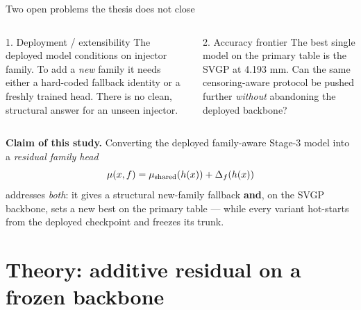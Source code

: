 \documentclass[UTF8,aspectratio=169]{ctexbeamer}
\begin{document}
\begin{frame}{Two open problems the thesis does not close}
\small
\begin{columns}[T]
\begin{block}{1. Deployment / extensibility}
The deployed model conditions on injector family. To add a \emph{new} family it
needs either a hard-coded fallback identity or a freshly trained head. There is no
clean, structural answer for an unseen injector.
\end{block}

\begin{block}{2. Accuracy frontier}
The best single model on the primary table is the SVGP at 4.193 mm. Can the same
censoring-aware protocol be pushed further \emph{without} abandoning the deployed
backbone?
\end{block}
\end{columns}

\vspace{0.6em}
\textbf{Claim of this study.} Converting the deployed family-aware Stage-3 model into a
\emph{residual family head}
\[
  \mu(x,f) = \mu_{\rm shared}(h(x)) + \Delta_f(h(x))
\]
addresses \emph{both}: it gives a structural new-family fallback \textbf{and}, on the
SVGP backbone, sets a new best on the primary table --- while every variant
hot-starts from the deployed checkpoint and freezes its trunk.
\end{frame}

\section{Theory: additive residual on a frozen backbone}
\end{document}
